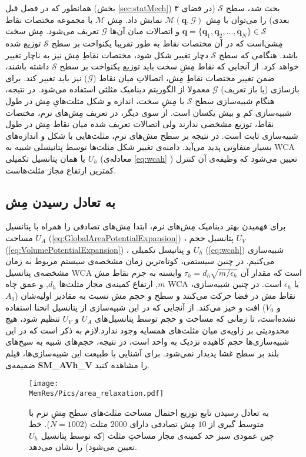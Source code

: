 همانطور که در فصل قبل (بخش 
\ref{sec:statMech})
بحث شد، سطح
$\mathcal{S}$
(در فضای ۳ بعدی) را می‌توان با مِش
$\mathcal{M}({\bm q},\mathcal{G})$
نمایش داد. مِش
$\mathcal{M}$
با مجموعه مختصات نقاط 
${\bm q}=\{{\bm q_1},{\bm q_2},...,{\bm q_N}\} \in \mathcal{S}$
و اتصالات میان آن‌ها
$\mathcal{G}$
تعریف می‌شود. مِش سخت مِشی‌است که در آن مختصات نقاط به طور تقریبا یکنواخت بر سطح 
$\mathcal{S}$
توزیع شده‌ باشد. هنگامی که سطح 
$\mathcal{S}$
دچار تغییر شکل شود، مختصات نقاطِ مِش نیز به ناچار تغییر خواهد کرد. از آنجایی که نقاط مِشِ سخت باید  توزیع یکنواخت بر سطح
$\mathcal{S}$
داشته باشند، ضمن تغییر مختصات نقاطِ مِش، اتصالاتِ میان نقاط
($\mathcal{G}$)
نیز باید تغییر کند. برای بازسازی (یا باز تعریف) 
$\mathcal{G}$
معمولا از الگوریتم دینامیک مثلثی
\cite{Boal1992PRA, Gompper1992Science}
استفاده می‌شود. در نتیجه، هنگام شبیه‌سازی سطح
$\mathcal{S}$
با مِشِ سخت، اندازه و شکل مثلث‌هایِ مِش در طول شبیه‌سازی ‌کم و بیش یکسان است. از سوی دیگر، در تعریف مِش‌های نرم، مختصات نقاط،  توزیع مشخصی ندارند ولی اتصالات تعریف شده میان نقاط مِش در طول شبیه‌سازی ثابت است. در نتیجه بر سطح مش‌های نرم، مثلث‌هایی با شکل و اندازه‌های بسیار متفاوتی پدید می‌آید.  دامنه‌ی تغییر شکل مثلث‌ها توسط پتانیسلی شبیه به 
WCA 
یا همان پتانسیل تکمیلی 
$U_h$
(معادله‌ی 
\ref{eq:wcah}
) تعیین می‌شود که وظیفه‌ی آن کنترل کمترین ارتفاع مجاز مثلث‌هاست. 


\subsection{\label{sec:MeshEquilibration}
به تعادل رسیدن مِش
}

برای فهمیدن بهتر دینامیک مِش‌های نرم، ابتدا مِش‌های تصادفی را همراه با پتانسیل مساحت
$U_A$ (\ref{eq:GlobalAreaPotentialExpansion})
، پتانسیل حجم 
$U_V$ (\ref{eq:VolumePotentialExpansion})
، و پتانیسل تکمیلی 
$U_h$ (\ref{eq:wcah})
 شبیه‌سازی می‌کنیم. در چنین سیستمی، کوتاه‌ترین زمان مشخصه‌ی سیستم مربوط به زمان مشخصه‌ی پتانسیل 
WCA
است که مقدار آن
 $\tau_h=d_h\sqrt{m/\epsilon_h}$
وابسته به جرم نقاط مش
$m$,
ارتفاع کمینه‌ی مجاز مثلث‌ها
$d_h$,
و عمق چاه 
WCA
یا 
$\epsilon_h$
است. در چنین شبیه‌سازی، نقاط مش در فضا حرکت می‌کنند و سطح و حجم مش نسبت به مقادیر اولیه‌شان 
($A_0$
و
$V_0$)
افت و خیز می‌کند. از آنجایی که در این شبیه‌سازی از پتانسیل انحنا استفاده نشده‌است، تا زمانی که مساحت و حجم توسط پتانسیل‌های
$U_A$
و
$U_V$
تنظیم شود، هیچ محدودیتی بر زاویه‌ی میان مثلث‌های همسایه وجود ندارد.لازم به ذکر است که در این شبیه‌سازی‌ها حجم کاهیده نزدیک به واحد است، در نتیجه، حجم‌های شبیه به سیخ‌های بلند بر سطح غشا پدیدار نمی‌شود. برای آشنایی با طبیعت این شبیه‌سازی‌ها، فیلم ضمیمه‌ی 
\textbf{SM\_AVh\_V}
را مشاهده کنید.
\begin{figure}[htbp]
\begin{center}
\texttt{[image: \\MemRes/Pics/area\_relaxation.pdf]}
\caption{
به تعادل رسیدن تابع توزیع احتمال مساحت مثلث‌های سطح مِشِ نزم با متوسط گیری از 
$10$
 مِش‌ تصادفی دارای
$2000$
مثلث 
($N=1002$).
خط چین عمودی سبز حد کمینه‌ی مجاز مساحتِ مثلث (که توسط پتانسیل
$U_h$
تعیین می‌شود) را نشان می‌دهد.
}
\label{fig:areaRelaxation}
\end{center}
\end{figure}


